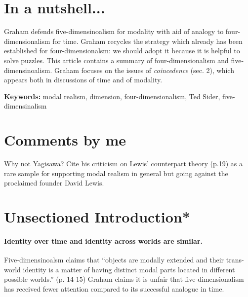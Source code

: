 \documentclass[
10pt, %
a4paper, %
twocolumn, %
landscape %
]{article}
\begin{document}
\pagestyle{myheadings} %
\markright{\doctitle} %


\thispagestyle{plain} %

\printtitle %


\section*{In a nutshell... }
Graham defends five-dimensinoalism for modality with aid of analogy to four-dimensionalism for time.
Graham recycles the strategy which already has been established for four-dimensionalsm: we should adopt it because it is helpful to solve puzzles.
This article contains a summary of four-dimensionalism and five-dimensinoalism.
Graham focuses on the issues of \emph{coincedence} (sec. 2), which appears both in discussions of time and of modality.

\noindent \textbf{Keywords:} modal realism, dimension, four-dimensionalism, Ted Sider, five-dimensinalism

\section*{Comments by me}
Why not Yagisawa?
Cite his criticism on Lewis' counterpart theory (p.19) as a rare sample for supporting modal realism in general but going against the proclaimed founder David Lewis.

\section*{Unsectioned Introduction*}
\paragraph{Identity over time and identity across worlds are similar.}
Five-dimensinoalsm claims that ``objects are modally extended and their trans-world identity is a matter of having distinct modal parts located in different possible worlds.'' (p. 14-15)
Graham claims it is unfair that five-dimensionalism has received fewer attention compared to its successful analogue in time.
\end{document}
